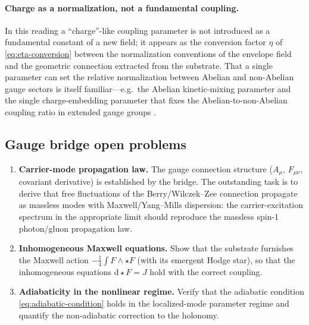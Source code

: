 \paragraph{Charge as a normalization, not a fundamental coupling.}
In this reading a ``charge''-like coupling parameter is not introduced as a fundamental constant of a
new field; it appears as the conversion factor $\eta$ of \eqref{eq:eta-conversion} between the
normalization conventions of the envelope field and the geometric connection extracted from the
substrate.
That a single parameter can set the relative normalization between Abelian and non-Abelian gauge
sectors is itself familiar---e.g.\ the Abelian kinetic-mixing parameter
\citep{Holdom1986KineticMixing,Fabbrichesi2021DarkPhoton} and the single charge-embedding parameter
that fixes the Abelian-to-non-Abelian coupling ratio in extended gauge groups
\citep{Hati2017LeftRight3331}.

\subsection{Gauge bridge open problems}
\label{subsec:gauge-open}

\begin{enumerate}
  \item \textbf{Carrier-mode propagation law.}
  The gauge connection structure ($A_\mu$, $F_{\mu\nu}$, covariant derivative) is established by
  the bridge.
  The outstanding task is to derive that free fluctuations of the Berry/Wilczek--Zee connection
  propagate as massless modes with Maxwell/Yang--Mills dispersion: the carrier-excitation spectrum
  in the appropriate limit should reproduce the massless spin-1 photon/gluon propagation law.

  \item \textbf{Inhomogeneous Maxwell equations.}
  Show that the substrate furnishes the Maxwell action $-\tfrac14\int F\wedge{\star}F$
  (with its emergent Hodge star), so that the inhomogeneous equations $\mathrm{d}{\star}F=J$ hold
  with the correct coupling.

  \item \textbf{Adiabaticity in the nonlinear regime.}
  Verify that the adiabatic condition \eqref{eq:adiabatic-condition} holds in the localized-mode
  parameter regime and quantify the non-adiabatic correction to the holonomy.
\end{enumerate}